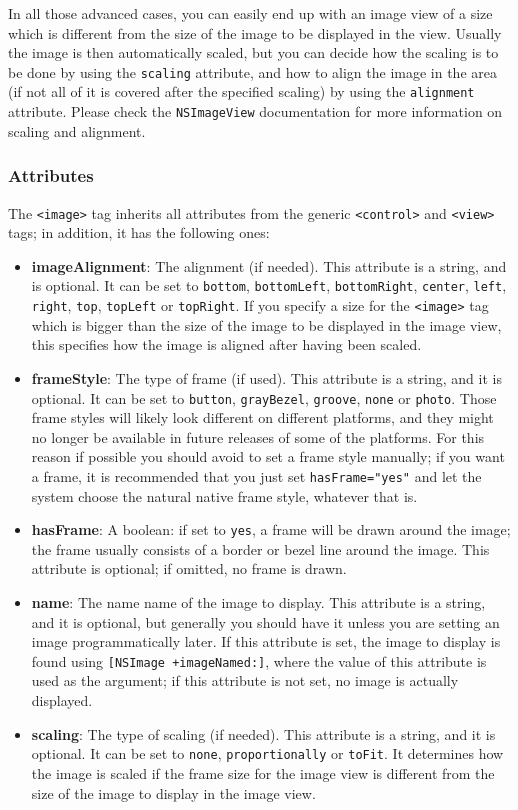 In all those advanced cases, you can easily end up with an image view
of a size which is different from the size of the image to be
displayed in the view.  Usually the image is then automatically
scaled, but you can decide how the scaling is to be done by using the
\texttt{scaling} attribute, and how to align the image in the area (if
not all of it is covered after the specified scaling) by using the
\texttt{alignment} attribute.  Please check the \texttt{NSImageView} 
documentation for more information on scaling and alignment.

\subsubsection{Attributes}
The \texttt{<image>} tag inherits all attributes from the generic
\texttt{<control>} and \texttt{<view>} tags; in addition, it has 
the following ones:
\begin{itemize}
\item {\bf imageAlignment}: The alignment (if needed).  This attribute
  is a string, and is optional.  It can be set to \texttt{bottom},
  \texttt{bottomLeft}, \texttt{bottomRight}, \texttt{center},
  \texttt{left}, \texttt{right}, \texttt{top}, \texttt{topLeft} or
  \texttt{topRight}.  If you specify a size for the \texttt{<image>}
  tag which is bigger than the size of the image to be displayed in
  the image view, this specifies how the image is aligned after having
  been scaled.
\item {\bf frameStyle}: The type of frame (if used).  This attribute
  is a string, and it is optional.  It can be set to \texttt{button},
  \texttt{grayBezel}, \texttt{groove}, \texttt{none} or
  \texttt{photo}.  Those frame styles will likely look different on
  different platforms, and they might no longer be available in future
  releases of some of the platforms.  For this reason if possible you
  should avoid to set a frame style manually; if you want a frame, it
  is recommended that you just set \texttt{hasFrame="yes"} and let the
  system choose the natural native frame style, whatever that is.
\item {\bf hasFrame}: A boolean: if set to \texttt{yes}, a frame will
  be drawn around the image; the frame usually consists of a border or
  bezel line around the image.  This attribute is optional; if
  omitted, no frame is drawn.
\item {\bf name}: The name name of the image to display.  This
  attribute is a string, and it is optional, but generally you should
  have it unless you are setting an image programmatically later.  If
  this attribute is set, the image to display is found using
  \texttt{[NSImage +imageNamed:]}, where the value of this attribute
  is used as the argument; if this attribute is not set, no image is
  actually displayed.
\item {\bf scaling}: The type of scaling (if needed).  This attribute
  is a string, and it is optional.  It can be set to \texttt{none},
  \texttt{proportionally} or \texttt{toFit}.  It determines how the
  image is scaled if the frame size for the image view is different
  from the size of the image to display in the image view.
\end{itemize}

